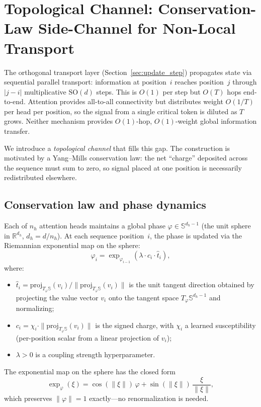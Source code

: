 \documentclass[11pt,a4paper]{article}
\theoremstyle{definition}
\theoremstyle{remark}
\newcommand{\R}{\mathbb{R}}
\newcommand{\Sphere}{\mathbb{S}}
\newcommand{\SO}{\mathrm{SO}}
\begin{document}
\section{Topological Channel: Conservation-Law Side-Channel 
for Non-Local Transport}\label{sec:topo_channel}

The orthogonal transport layer (Section~\ref{sec:update_step}) 
propagates state via sequential parallel transport: information 
at position~$i$ reaches position~$j$ through $|j - i|$ 
multiplicative $\SO(d)$ steps. This is $O(1)$ per step but 
$O(T)$ hops end-to-end. Attention provides all-to-all 
connectivity but distributes weight $O(1/T)$ per head per 
position, so the signal from a single critical token is 
diluted as $T$ grows. Neither mechanism provides $O(1)$-hop, 
$O(1)$-weight global information transfer.

We introduce a \emph{topological channel} that fills this gap. 
The construction is motivated by a Yang--Mills conservation law: 
the net ``charge'' deposited across the sequence must sum to 
zero, so signal placed at one position is necessarily 
redistributed elsewhere.

\subsection{Conservation law and phase dynamics}%
\label{sec:topo_conservation}

Each of $n_h$ attention heads maintains a global phase 
$\varphi \in \Sphere^{d_h - 1}$ (the unit sphere in 
$\R^{d_h}$, $d_h = d / n_h$). At each sequence position~$i$, 
the phase is updated via the Riemannian exponential map on the 
sphere:
\begin{equation}\label{eq:topo_exp_map}
  \varphi_i = \exp_{\varphi_{i-1}}(\lambda \cdot c_i \cdot 
  \hat{t}_i),
\end{equation}
where:
\begin{itemize}[nosep]
  \item $\hat{t}_i = \mathrm{proj}_{T_{\varphi} \Sphere}(v_i) 
  / \|\mathrm{proj}_{T_{\varphi} \Sphere}(v_i)\|$ is the 
  unit tangent direction obtained by projecting the value 
  vector $v_i$ onto the tangent space 
  $T_{\varphi} \Sphere^{d_h - 1}$ and normalizing;
  \item $c_i = \chi_i \cdot \|\mathrm{proj}_{T_{\varphi} 
  \Sphere}(v_i)\|$ is the signed charge, with $\chi_i$ a 
  learned susceptibility (per-position scalar from a linear 
  projection of $v_i$);
  \item $\lambda > 0$ is a coupling strength hyperparameter.
\end{itemize}
The exponential map on the sphere has the closed form
\begin{equation}\label{eq:sphere_exp}
  \exp_\varphi(\xi) = \cos(\|\xi\|)\,\varphi 
  + \sin(\|\xi\|)\,\frac{\xi}{\|\xi\|},
\end{equation}
which preserves $\|\varphi\| = 1$ exactly---no 
renormalization is needed.
\end{document}
